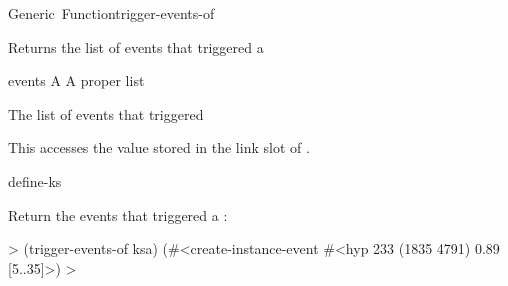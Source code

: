 \documentclass[10pt,twoside,english,pdftex]{article}
\begin{document}
\begin{functiondoc}{Generic~Function}{trigger-events-of}{ 
    \returns{} }
%
%

\fnsyntax

\fnpurpose Returns the list of events that triggered a 

\fnmethods
{}

\fnpackage {}

\fnmodule {}

\fnargs
\begin{args}{events}
\arg[ksa] A 
\arg[events] A proper list
\end{args}

\fnreturns The list of events that triggered 
  
\fndescription 
This  accesses the value stored in the
 link slot of .

\begin{alsos}{define-ks}
\also[define-ks]
\also[ks]
\also[ksa]
\end{alsos}

\fnexample
Return the events that triggered a :
%
\W\supp
\begin{example}
  > (trigger-events-of ksa)
  (#<create-instance-event #<hyp 233 (1835 4791) 0.89 [5..35]>)
  >
\end{example}

\end{functiondoc}

\end{document}
